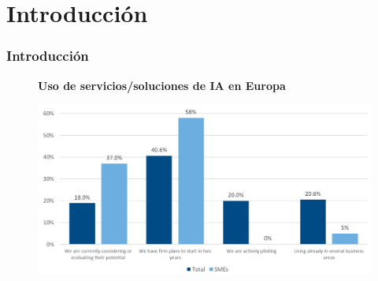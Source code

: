 \documentclass[10pt]{beamer}
\begin{document}
\section{Introducción}
\begin{frame}
\frametitle{Introducción}
\begin{figure}[htbp]
	\begin{center}
		\vspace{-1cm}
		{\large{\textbf{\textcolor{pantone}{\center Uso de servicios/soluciones de IA en Europa}}}}\par\medskip\medskip\medskip\medskip\medskip
		\includegraphics[width = .95\textwidth]{Figuras/AIuse}
	\end{center}
\end{figure}
\end{frame}
\end{document}
